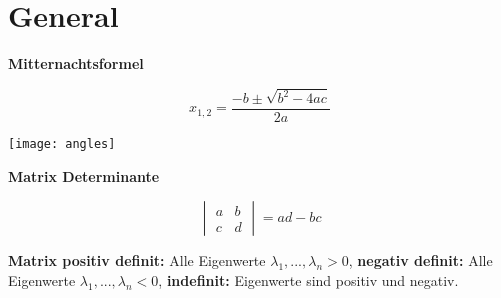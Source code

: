 \section{General}

\textbf{Mitternachtsformel}

\[
    x_{1, 2} = \frac{-b \pm \sqrt{b^2 - 4ac}}{2a}
\]

\texttt{[image: angles]}

\textbf{Matrix Determinante}

\[
    \begin{vmatrix}
        a & b\\
        c & d
    \end{vmatrix} = ad-bc
\]

\textbf{Matrix positiv definit:} Alle Eigenwerte $\lambda_1, ..., \lambda_n > 0$, \textbf{negativ definit:} Alle Eigenwerte $\lambda_1, ..., \lambda_n < 0$, \textbf{indefinit:} Eigenwerte sind positiv und negativ.\\